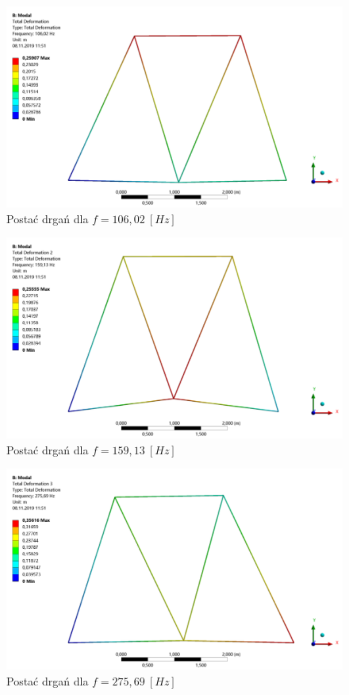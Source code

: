 \documentclass[12pt, a4papper, twoside]{article}
\begin{document}
\newpage

\begin{figure}[H]
    \centering
    \includegraphics[width=\textwidth, height=0.6\textwidth]{mode1.png}
    \caption{Postać drgań dla $f=106,02\ [Hz]$}
    \label{rys:mode1}
\end{figure}

\begin{figure}[H]
    \centering
    \includegraphics[width=\textwidth, height=0.6\textwidth]{mode2.png}
    \caption{Postać drgań dla $f=159,13\ [Hz]$}
    \label{rys:mode2}
\end{figure}


\begin{figure}[H]
    \centering
    \includegraphics[width=\textwidth, height=0.6\textwidth]{mode3.png}
    \caption{Postać drgań dla $f=275,69\ [Hz]$}
    \label{rys:mode3}
\end{figure}
\end{document}
